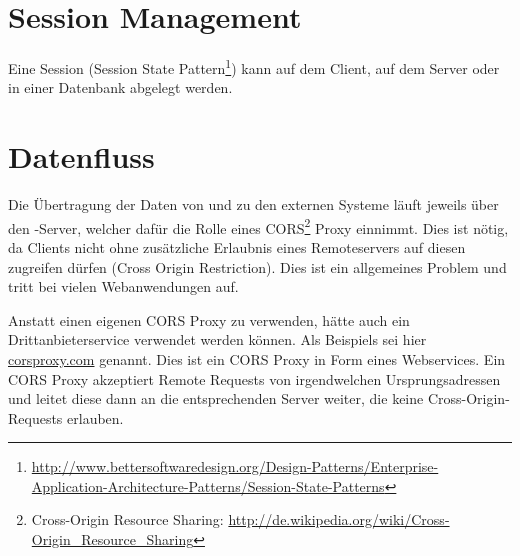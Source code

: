 \section{Session Management}
	Eine Session (Session State Pattern\footnote{\href{http://www.bettersoftwaredesign.org/Design-Patterns/Enterprise-Application
	-Architecture-Patterns/Session-State-Patterns}{http://www.bettersoftwaredesign.org/Design-Patterns/Enterprise-Application-Architecture-Patterns/Session-State-Patterns}}) kann auf dem Client, auf dem Server oder in einer Datenbank abgelegt werden.
	
		
	\section{Datenfluss}			
		Die Übertragung der Daten von und zu den externen Systeme läuft jeweils über den \eeppi-Server, welcher dafür die Rolle eines CORS\footnote{Cross-Origin Resource Sharing: \url{http://de.wikipedia.org/wiki/Cross-Origin_Resource_Sharing}} Proxy einnimmt. 
		Dies ist nötig, da Clients nicht ohne zusätzliche Erlaubnis eines Remoteservers
		auf diesen zugreifen dürfen (Cross Origin Restriction).
		Dies ist ein allgemeines Problem und tritt bei vielen Webanwendungen auf.
		
		Anstatt einen eigenen CORS Proxy zu verwenden, hätte auch ein Drittanbieterservice verwendet werden können.
		Als Beispiels sei hier \hyperlink{http://www.corsproxy.com/}{corsproxy.com} genannt.
		Dies ist ein CORS Proxy in Form eines Webservices.
		Ein CORS Proxy akzeptiert Remote Requests von irgendwelchen Ursprungsadressen und leitet diese dann
		an die entsprechenden Server weiter, die keine Cross-Origin-Requests erlauben.
		
